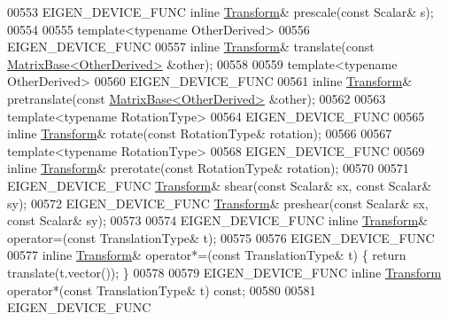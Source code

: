 \begin{DoxyCode}
00553   EIGEN\_DEVICE\_FUNC \textcolor{keyword}{inline} \hyperlink{group___geometry___module_class_eigen_1_1_transform}{Transform}& prescale(\textcolor{keyword}{const} Scalar& s);
00554 
00555   \textcolor{keyword}{template}<\textcolor{keyword}{typename} OtherDerived>
00556   EIGEN\_DEVICE\_FUNC
00557   \textcolor{keyword}{inline} \hyperlink{group___geometry___module_class_eigen_1_1_transform}{Transform}& translate(\textcolor{keyword}{const} \hyperlink{group___core___module_class_eigen_1_1_matrix_base}{MatrixBase<OtherDerived>} &other);
00558 
00559   \textcolor{keyword}{template}<\textcolor{keyword}{typename} OtherDerived>
00560   EIGEN\_DEVICE\_FUNC
00561   \textcolor{keyword}{inline} \hyperlink{group___geometry___module_class_eigen_1_1_transform}{Transform}& pretranslate(\textcolor{keyword}{const} \hyperlink{group___core___module_class_eigen_1_1_matrix_base}{MatrixBase<OtherDerived>} &other);
00562 
00563   \textcolor{keyword}{template}<\textcolor{keyword}{typename} RotationType>
00564   EIGEN\_DEVICE\_FUNC
00565   \textcolor{keyword}{inline} \hyperlink{group___geometry___module_class_eigen_1_1_transform}{Transform}& rotate(\textcolor{keyword}{const} RotationType& rotation);
00566 
00567   \textcolor{keyword}{template}<\textcolor{keyword}{typename} RotationType>
00568   EIGEN\_DEVICE\_FUNC
00569   \textcolor{keyword}{inline} \hyperlink{group___geometry___module_class_eigen_1_1_transform}{Transform}& prerotate(\textcolor{keyword}{const} RotationType& rotation);
00570 
00571   EIGEN\_DEVICE\_FUNC \hyperlink{group___geometry___module_class_eigen_1_1_transform}{Transform}& shear(\textcolor{keyword}{const} Scalar& sx, \textcolor{keyword}{const} Scalar& sy);
00572   EIGEN\_DEVICE\_FUNC \hyperlink{group___geometry___module_class_eigen_1_1_transform}{Transform}& preshear(\textcolor{keyword}{const} Scalar& sx, \textcolor{keyword}{const} Scalar& sy);
00573 
00574   EIGEN\_DEVICE\_FUNC \textcolor{keyword}{inline} \hyperlink{group___geometry___module_class_eigen_1_1_transform}{Transform}& operator=(\textcolor{keyword}{const} TranslationType& t);
00575   
00576   EIGEN\_DEVICE\_FUNC
00577   \textcolor{keyword}{inline} \hyperlink{group___geometry___module_class_eigen_1_1_transform}{Transform}& operator*=(\textcolor{keyword}{const} TranslationType& t) \{ \textcolor{keywordflow}{return} translate(t.vector()); \}
00578   
00579   EIGEN\_DEVICE\_FUNC \textcolor{keyword}{inline} \hyperlink{group___geometry___module_class_eigen_1_1_transform}{Transform} operator*(\textcolor{keyword}{const} TranslationType& t) \textcolor{keyword}{const};
00580 
00581   EIGEN\_DEVICE\_FUNC 

\end{DoxyCode}
